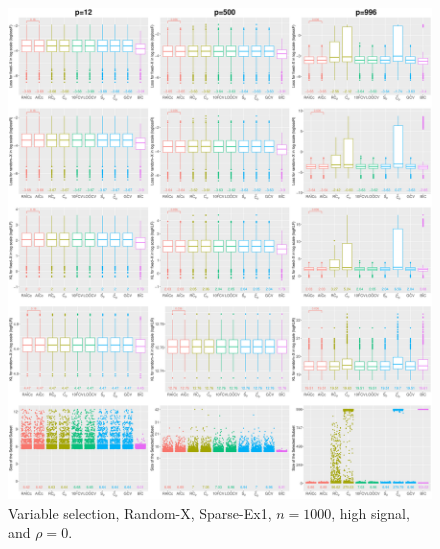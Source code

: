 \begin{figure}[!ht]
\centering
\includegraphics[width=\textwidth]{figures/supplement/randomx/subset_selection/Sparse-Ex1_n1000_hsnr_rho0.eps}
\caption{Variable selection, Random-X, Sparse-Ex1, $n=1000$, high signal, and $\rho=0$.}
\end{figure}
\clearpage
